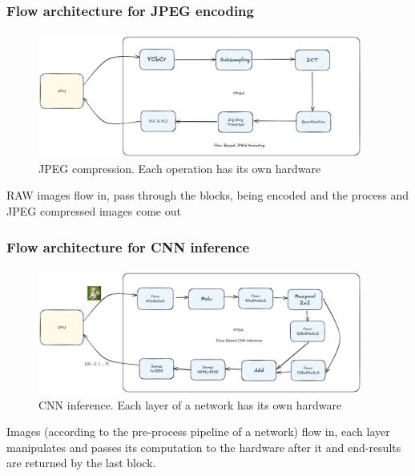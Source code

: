 \documentclass{beamer}
\begin{document}
\begin{frame}[fragile]
  \frametitle{Flow architecture for JPEG encoding}
  \framesubtitle{}
  \begin{figure}
    \centering
    \includegraphics[width=0.95\textwidth]{flowjpeg.png}
    \caption{JPEG compression. Each operation has its own hardware}
    \label{}
  \end{figure}

  RAW images flow in, pass through the blocks, being encoded
  and the process and JPEG compressed images come out
\end{frame}

\begin{frame}[fragile]
  \frametitle{Flow architecture for CNN inference}
  \framesubtitle{}
  \begin{figure}
    \centering
    \includegraphics[width=0.95\textwidth]{flowcnn.png}
    \caption{CNN inference. Each layer of a network has its own hardware}
    \label{}
  \end{figure}

  Images (according to the pre-process pipeline of a network) flow
  in, each layer manipulates and passes its computation to the
  hardware after it and end-results are returned by the last
  block.
\end{frame}
\end{document}
